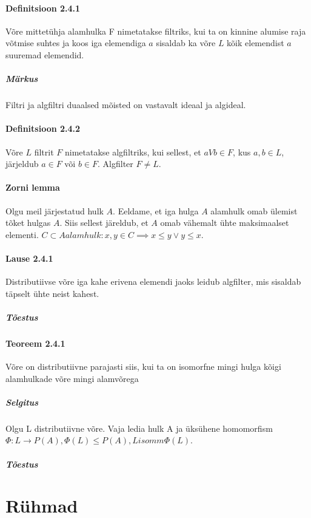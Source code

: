 \documentclass[12pt]{report}
\numberwithin{equation}{section}
\theoremstyle{definition}
\theoremstyle{plain}
\begin{document}
\paragraph{Definitsioon 2.4.1}
Võre mittetühja alamhulka F nimetatakse filtriks, kui ta on kinnine alumise raja võtmise suhtes ja koos iga elemendiga $a$ sisaldab ka võre $L$ kõik elemendist $a$ suuremad elemendid.

\subparagraph{Märkus}
Filtri ja algfiltri duaalsed mõisted on vastavalt ideaal ja algideal.

\paragraph{Definitsioon 2.4.2}
Võre $L$ filtrit $F$ nimetatakse algfiltriks, kui sellest, et $a V b \in F$, kus $a,b \in L$, järjeldub
$a \in F$ või $b \in F$. Algfilter $F \neq L$. 

\paragraph{Zorni lemma}
Olgu meil järjestatud hulk $A$. Eeldame, et iga hulga $A$ alamhulk omab ülemist tõket hulgas $A$. Siis sellest järeldub, et $A$ omab vähemalt ühte maksimaalset elementi. $C \subset A alamhulk: x,y \in C \implies x \leq y \lor y \leq x$.

\paragraph{Lause 2.4.1}
Distributiivse võre iga kahe erivena elemendi jaoks leidub algfilter, mis sisaldab täpselt ühte neist kahest. 

\subparagraph{Tõestus}


\paragraph{Teoreem 2.4.1}
Võre on distributiivne parajasti siis, kui ta on isomorfne mingi hulga kõigi alamhulkade võre mingi alamvõrega

\subparagraph{Selgitus}
Olgu L distributiivne võre. Vaja ledia hulk A ja \"uks\"uhene homomorfism $\Phi : L \rightarrow P(A), \Phi(L) \leq P(A), L isomm \Phi(L)$. 

\subparagraph{Tõestus}

\section{R\"uhmad}
\end{document}
